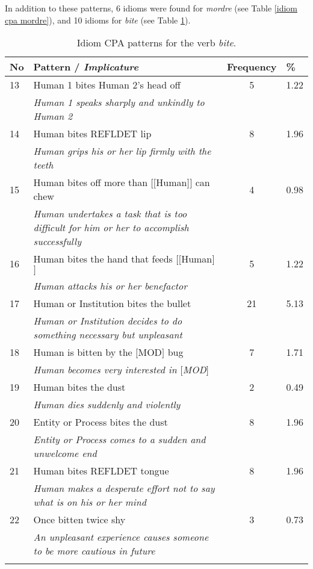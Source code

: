 \documentclass[output=paper]{langsci/langscibook}
\begin{document}
In addition to these patterns, 6 idioms were found for \textit{mordre} (see
Table \ref{idiom cpa mordre}), and 10 idioms for \textit{bite} (see Table \ref{idiom cpa bite}).






\begin{table}[H]
\small
\begin{tabular}{p{8mm}p{7.5cm} c p{1cm}}
\lsptoprule
No & Pattern / \textit{Implicature} & Frequency & \%\\
\midrule
13 &
Human 1 bites Human 2's head off &
5 &
1.22\\
 &
\textit{Human 1 speaks sharply and unkindly to Human 2} &
 &
\\
14 &
Human bites REFLDET lip &
8 &
1.96\\
 &
\textit{Human grips his or her lip firmly with the teeth} &
 &
\\
15 &
Human bites off more than $[$$[$Human$]$$]$ can chew &
4 &
0.98\\
 &
\textit{Human undertakes a task that is too difficult for him
or her to accomplish successfully} &
 &
\\
16 &
Human bites the hand that feeds $[$$[$Human$]$$]$ &
5 &
1.22\\
 &
\textit{Human attacks his or her benefactor} &
 &
\\
17 &
Human or Institution bites the bullet &
21 &
5.13\\
 &
\textit{Human or Institution decides to do something
necessary but unpleasant} &
 &
\\
18 &
Human is bitten by the $[$MOD$]$ bug &
7 &
1.71\\
 &
\textit{Human becomes very interested in $[$MOD$]$} &
 &
\\
19 &
Human bites the dust &
2 &
0.49\\
 &
\textit{Human dies suddenly and violently} &
 &
\\
20 &
Entity or Process bites the dust &
8 &
1.96\\
 &
\textit{Entity or Process comes to a sudden and unwelcome
end} &
 &
\\
21 &
Human bites REFLDET tongue &
8 &
1.96\\
 &
\textit{Human makes a desperate effort not to say what is on
his or her mind} &
 &
\\
22 &
Once bitten twice shy &
3 &
0.73\\
 &
\textit{An unpleasant experience causes someone to be more
cautious in future} &
 &
\\
\lspbottomrule
\end{tabular}
\caption{Idiom CPA patterns for the verb \textit{bite}.}
\label{idiom cpa bite}
\end{table}
\end{document}

